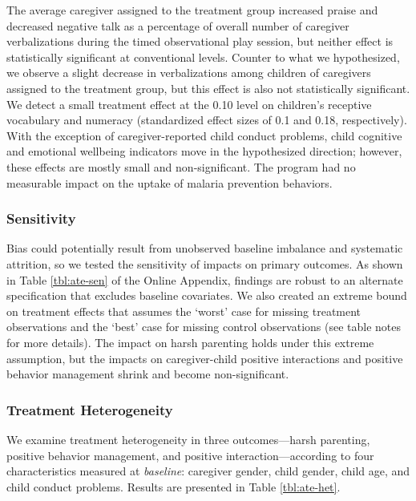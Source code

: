 \documentclass[12pt,authoryear]{elsarticle}\usepackage{knitr}
\begin{document}
The average caregiver assigned to the treatment group increased praise and decreased negative talk as a percentage of overall number of caregiver verbalizations during the timed observational play session, but neither effect is statistically significant at conventional levels. Counter to what we hypothesized, we observe a slight decrease in verbalizations among children of caregivers assigned to the treatment group, but this effect is also not statistically significant. We detect a small treatment effect at the 0.10 level on children's receptive vocabulary and numeracy (standardized effect sizes of 0.1 and 0.18, respectively). With the exception of caregiver-reported child conduct problems, child cognitive and emotional wellbeing indicators move in the hypothesized direction; however, these effects are mostly small and non-significant. The program had no measurable impact on the uptake of malaria prevention behaviors.

\subsubsection*{Sensitivity}

Bias could potentially result from unobserved baseline imbalance and systematic attrition, so we tested the sensitivity of impacts on primary outcomes. As shown in Table \ref{tbl:ate-sen} of the Online Appendix, findings are robust to an alternate specification that excludes baseline covariates. We also created an extreme bound on treatment effects that assumes the `worst' case for missing treatment observations and the `best' case for missing control observations (see table notes for more details). The impact on harsh parenting holds under this extreme assumption, but the impacts on caregiver-child positive interactions and positive behavior management shrink and become non-significant. 

\subsubsection*{Treatment Heterogeneity}

We examine treatment heterogeneity in three outcomes---harsh parenting, positive behavior management, and positive interaction---according to four characteristics measured at \textit{baseline}: caregiver gender, child gender, child age, and child conduct problems. Results are presented in Table \ref{tbl:ate-het}. 


\end{document}

